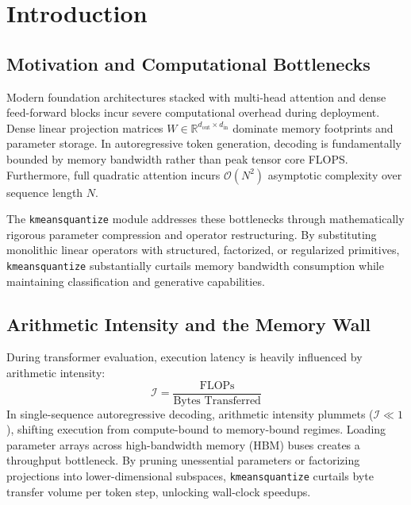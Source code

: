 \section{Introduction}

\subsection{Motivation and Computational Bottlenecks}
Modern foundation architectures stacked with multi-head attention and dense feed-forward blocks incur severe computational overhead during deployment. Dense linear projection matrices $W \in \mathbb{R}^{d_{\text{out}} \times d_{\text{in}}}$ dominate memory footprints and parameter storage. In autoregressive token generation, decoding is fundamentally bounded by memory bandwidth rather than peak tensor core FLOPS. Furthermore, full quadratic attention incurs $\mathcal{O}(N^2)$ asymptotic complexity over sequence length $N$.

The \texttt{kmeansquantize} module addresses these bottlenecks through mathematically rigorous parameter compression and operator restructuring. By substituting monolithic linear operators with structured, factorized, or regularized primitives, \texttt{kmeansquantize} substantially curtails memory bandwidth consumption while maintaining classification and generative capabilities.

\subsection{Arithmetic Intensity and the Memory Wall}
During transformer evaluation, execution latency is heavily influenced by arithmetic intensity:
\[
\mathcal{I} = \frac{\text{FLOPs}}{\text{Bytes Transferred}}
\]
In single-sequence autoregressive decoding, arithmetic intensity plummets ($\mathcal{I} \ll 1$), shifting execution from compute-bound to memory-bound regimes. Loading parameter arrays across high-bandwidth memory (HBM) buses creates a throughput bottleneck. By pruning unessential parameters or factorizing projections into lower-dimensional subspaces, \texttt{kmeansquantize} curtails byte transfer volume per token step, unlocking wall-clock speedups.

